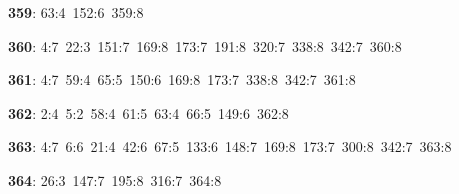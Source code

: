 \noindent \textbf{359}: 63:4\allowbreak\ 152:6\allowbreak\ 359:8\par
\noindent \textbf{360}: 4:7\allowbreak\ 22:3\allowbreak\ 151:7\allowbreak\ 169:8\allowbreak\ 173:7\allowbreak\ 191:8\allowbreak\ 320:7\allowbreak\ 338:8\allowbreak\ 342:7\allowbreak\ 360:8\par
\noindent \textbf{361}: 4:7\allowbreak\ 59:4\allowbreak\ 65:5\allowbreak\ 150:6\allowbreak\ 169:8\allowbreak\ 173:7\allowbreak\ 338:8\allowbreak\ 342:7\allowbreak\ 361:8\par
\noindent \textbf{362}: 2:4\allowbreak\ 5:2\allowbreak\ 58:4\allowbreak\ 61:5\allowbreak\ 63:4\allowbreak\ 66:5\allowbreak\ 149:6\allowbreak\ 362:8\par
\noindent \textbf{363}: 4:7\allowbreak\ 6:6\allowbreak\ 21:4\allowbreak\ 42:6\allowbreak\ 67:5\allowbreak\ 133:6\allowbreak\ 148:7\allowbreak\ 169:8\allowbreak\ 173:7\allowbreak\ 300:8\allowbreak\ 342:7\allowbreak\ 363:8\par
\noindent \textbf{364}: 26:3\allowbreak\ 147:7\allowbreak\ 195:8\allowbreak\ 316:7\allowbreak\ 364:8\par
